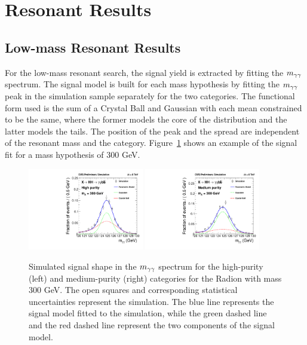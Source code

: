 \section{Resonant Results\label{sec:resresults}}

\subsection{Low-mass Resonant Results}

For the low-mass resonant search, the signal yield is extracted by fitting the $m_{\gamma\gamma}$ spectrum.
The signal model is built for each mass hypothesis by fitting the $m_{\gamma\gamma}$ peak in the simulation sample
separately for the two categories. The functional form used is the sum of a Crystal Ball and
Gaussian with each mean constrained to be the same,
where the former models the core of the distribution and the latter models the
tails. The position of the peak and the spread are independent of the resonant mass and the
category. Figure~\ref{fig:sigfit_300} shows an example of the signal fit for a mass hypothesis of
300 GeV.

\begin{figure}[ht!]
 \begin{center}
   \includegraphics[width=0.45\textwidth]{figures/results/sigmodel_cat0_300.pdf}
   \includegraphics[width=0.45\textwidth]{figures/results/sigmodel_cat1_300.pdf}
 \end{center}
\caption{Simulated signal shape in the $m_{\gamma\gamma}$ spectrum for the high-purity (left) and medium-purity
(right) categories for the Radion with mass 300 GeV. The open squares and corresponding
statistical uncertainties represent the simulation.
The blue line represents the signal model fitted to the simulation, while the green dashed line
and the red dashed line represent the two components of the signal model.}
\label{fig:sigfit_300}
\end{figure}

